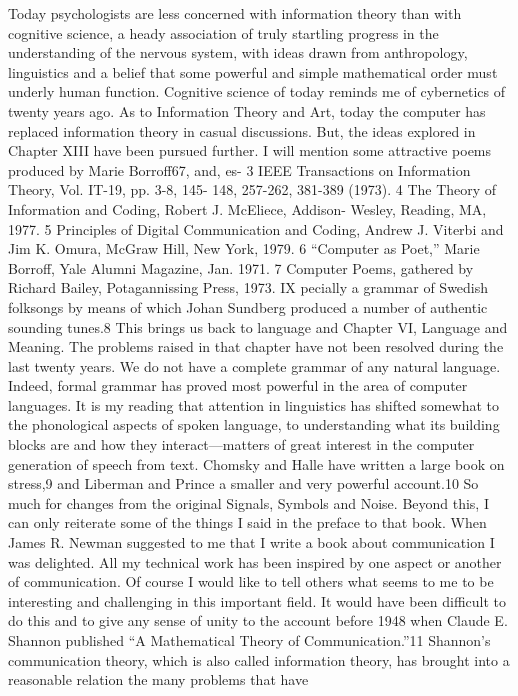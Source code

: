 Today psychologists are less concerned with information theory
than with cognitive science, a heady association of truly startling
progress in the understanding of the nervous system, with ideas
drawn from anthropology, linguistics and a belief that some powerful
and simple mathematical order must underly human function.
Cognitive science of today reminds me of cybernetics of twenty
years ago.
As to Information Theory and Art, today the computer has replaced
information theory in casual discussions. But, the ideas
explored in Chapter XIII have been pursued further. I will mention
some attractive poems produced by Marie Borroff67, and, es-
3 IEEE Transactions on Information Theory, Vol. IT-19, pp. 3-8, 145-
148, 257-262, 381-389 (1973).
4 The Theory of Information and Coding, Robert J. McEliece, Addison-
Wesley, Reading, MA, 1977.
5 Principles of Digital Communication and Coding, Andrew J. Viterbi and
Jim K. Omura, McGraw Hill, New York, 1979.
6 “Computer as Poet,” Marie Borroff, Yale Alumni Magazine, Jan. 1971.
7 Computer Poems, gathered by Richard Bailey, Potagannissing Press,
1973.
IX
pecially a grammar of Swedish folksongs by means of which Johan
Sundberg produced a number of authentic sounding tunes.8
This brings us back to language and Chapter VI, Language and
Meaning. The problems raised in that chapter have not been resolved
during the last twenty years. We do not have a complete
grammar of any natural language. Indeed, formal grammar has
proved most powerful in the area of computer languages. It is my
reading that attention in linguistics has shifted somewhat to the
phonological aspects of spoken language, to understanding what
its building blocks are and how they interact—matters of great
interest in the computer generation of speech from text. Chomsky
and Halle have written a large book on stress,9 and Liberman and
Prince a smaller and very powerful account.10
So much for changes from the original Signals, Symbols and
Noise. Beyond this, I can only reiterate some of the things I said
in the preface to that book.
When James R. Newman suggested to me that I write a book
about communication I was delighted. All my technical work has
been inspired by one aspect or another of communication. Of
course I would like to tell others what seems to me to be interesting
and challenging in this important field.
It would have been difficult to do this and to give any sense of
unity to the account before 1948 when Claude E. Shannon published
“A Mathematical Theory of Communication.”11 Shannon’s
communication theory, which is also called information theory,
has brought into a reasonable relation the many problems that have
